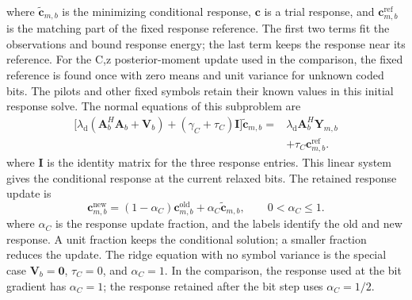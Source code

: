 \documentclass[conference]{IEEEtran}
\begin{document}
where \(\widetilde{\mathbf c}_{m,b}\) is the minimizing conditional response,
\(\mathbf c\) is a trial response, and \(\mathbf c_{m,b}^{\mathrm{ref}}\) is
the matching part of the fixed response reference.  The first two terms fit
the observations and bound response energy; the last term keeps the response
near its reference.
For the C,z posterior-moment update used in the comparison, the fixed
reference is found once with zero means and unit variance for unknown coded
bits.  The pilots and other fixed symbols retain their known values in this
initial response solve.
The normal equations of this subproblem are
\begin{equation}
  \begin{aligned}
  \Big[
  \lambda_{\mathrm d}(\mathbf A_b^H\mathbf A_b+\mathbf V_b)
  +(\gamma_C+\tau_C)\mathbf I
  \Big]\widetilde{\mathbf c}_{m,b}
  ={}&
  \lambda_{\mathrm d}\mathbf A_b^H\mathbf Y_{m,b}\\
  &+\tau_C\mathbf c_{m,b}^{\mathrm{ref}} .
  \end{aligned}
  \label{eq:response-normal}
\end{equation}
where \(\mathbf I\) is the identity matrix for the three response entries.
This linear system gives the conditional response at the current relaxed
bits.
The retained response update is
\begin{equation}
  \mathbf c_{m,b}^{\mathrm{new}}
  =
  (1-\alpha_C)\mathbf c_{m,b}^{\mathrm{old}}
  +\alpha_C\widetilde{\mathbf c}_{m,b},
  \qquad 0<\alpha_C\leq1.
  \label{eq:response-update}
\end{equation}
where \(\alpha_C\) is the response update fraction, and the labels identify
the old and new response.  A unit fraction keeps the conditional solution;
a smaller fraction reduces the update.
The ridge equation with no symbol variance is the special case
\(\mathbf V_b=\mathbf0\), \(\tau_C=0\), and \(\alpha_C=1\).  In the
comparison, the response used at the bit gradient has \(\alpha_C=1\);
the response retained after the bit step uses \(\alpha_C=1/2\).
\end{document}
